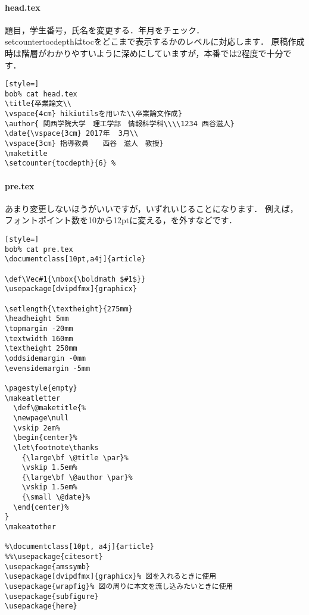 \paragraph{head.tex}
題目，学生番号，氏名を変更する．年月をチェック．
\\setcounter{tocdepth}はtocをどこまで表示するかのレベルに対応します．
原稿作成時は階層がわかりやすいように深めにしていますが，本番では2程度で十分です．
\begin{lstlisting}[style=]
bob% cat head.tex
\title{卒業論文\\
\vspace{4cm} hikiutilsを用いた\\卒業論文作成}
\author{ 関西学院大学　理工学部　情報科学科\\\\1234 西谷滋人}
\date{\vspace{3cm} 2017年  3月\\
\vspace{3cm} 指導教員　　西谷　滋人　教授}
\maketitle
\setcounter{tocdepth}{6} %

\end{lstlisting}
\paragraph{pre.tex}
あまり変更しないほうがいいですが，いずれいじることになります．
例えば，フォントポイント数を10から12ptに変える，\pagestyle{empty}を外すなどです．
\begin{lstlisting}[style=]
bob% cat pre.tex
\documentclass[10pt,a4j]{article}

\def\Vec#1{\mbox{\boldmath $#1$}}
\usepackage[dvipdfmx]{graphicx}

\setlength{\textheight}{275mm}
\headheight 5mm
\topmargin -20mm
\textwidth 160mm
\textheight 250mm
\oddsidemargin -0mm
\evensidemargin -5mm

\pagestyle{empty}
\makeatletter
  \def\@maketitle{%
  \newpage\null
  \vskip 2em%
  \begin{center}%
  \let\footnote\thanks
    {\large\bf \@title \par}%
    \vskip 1.5em%
    {\large\bf \@author \par}%
    \vskip 1.5em%
    {\small \@date}%
  \end{center}%
}
\makeatother

%\documentclass[10pt, a4j]{article}
%%\usepackage{citesort}
\usepackage{amssymb}
\usepackage[dvipdfmx]{graphicx}% 図を入れるときに使用
\usepackage{wrapfig}% 図の周りに本文を流し込みたいときに使用
\usepackage{subfigure}
\usepackage{here}
\end{lstlisting}
